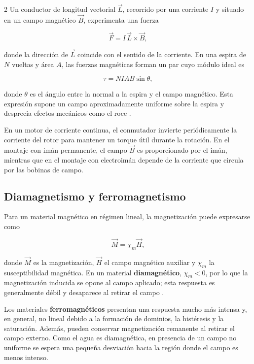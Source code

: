 \documentclass[10pt,letterpaper]{article}
\begin{document}
\begin{multicols}{2}
Un conductor de longitud vectorial $\vec L$, recorrido por una corriente $I$ y situado en un campo magnético $\vec B$, experimenta una fuerza

\begin{equation}
  \vec F=I\,\vec L\times\vec B,
  \label{eq:fuerza}
\end{equation}

donde la dirección de $\vec L$ coincide con el sentido de la corriente. En una espira de $N$ vueltas y área $A$, las fuerzas magnéticas forman un par cuyo módulo ideal es

\begin{equation}
  \tau=NIAB\sin\theta,
  \label{eq:torque}
\end{equation}

donde $\theta$ es el ángulo entre la normal a la espira y el campo magnético. Esta expresión supone un campo aproximadamente uniforme sobre la espira y desprecia efectos mecánicos como el roce \cite{griffiths2017}.

En un motor de corriente continua, el conmutador invierte periódicamente la corriente del rotor para mantener un torque útil durante la rotación. En el montaje con imán permanente, el campo $\vec B$ es proporcionado por el imán, mientras que en el montaje con electroimán depende de la corriente que circula por las bobinas de campo.

\subsection{Diamagnetismo y ferromagnetismo}

Para un material magnético en régimen lineal, la magnetización puede expresarse como

\begin{equation}
  \vec M=\chi_m\vec H,
  \label{eq:magnetizacion}
\end{equation}

donde $\vec M$ es la magnetización, $\vec H$ el campo magnético auxiliar y $\chi_m$ la susceptibilidad magnética. En un material \textbf{diamagnético}, $\chi_m<0$, por lo que la magnetización inducida se opone al campo aplicado; esta respuesta es generalmente débil y desaparece al retirar el campo \cite{griffiths2017}.

Los materiales \textbf{ferromagnéticos} presentan una respuesta mucho más intensa y, en general, no lineal debido a la formación de dominios, la histéresis y la saturación. Además, pueden conservar magnetización remanente al retirar el campo externo. Como el agua es diamagnética, en presencia de un campo no uniforme se espera una pequeña desviación hacia la región donde el campo es menos intenso.


\end{multicols}
\end{document}
